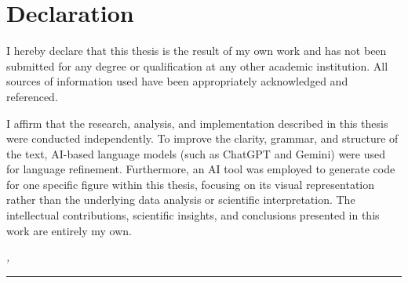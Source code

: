 %
\chapter*{Declaration}
\label{sec:declaration}
\thispagestyle{empty}
I hereby declare that this thesis is the result of my own work and has not been submitted for any degree or qualification at any other academic institution. All sources of information used have been appropriately acknowledged and referenced.

I affirm that the research, analysis, and implementation described in this thesis were conducted independently. To improve the clarity, grammar, and structure of the text, AI-based language models (such as ChatGPT and Gemini) were used for language refinement. Furthermore, an AI tool was employed to generate code for one specific figure within this thesis, focusing on its visual representation rather than the underlying data analysis or scientific interpretation. The intellectual contributions, scientific insights, and conclusions presented in this work are entirely my own.

\bigskip

\noindent\textit{\thesisUniversityCity, \thesisDateSubmission}

\smallskip

\begin{flushright}
	\begin{minipage}{5cm}
		\rule{\textwidth}{1pt}
		\centering\thesisName
	\end{minipage}
\end{flushright}

